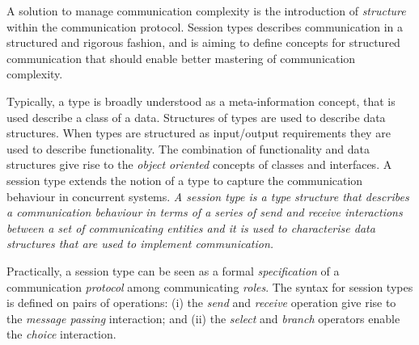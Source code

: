 A solution to manage communication complexity
is the introduction of \emph{structure} within the communication protocol.
Session types describes communication in a structured and rigorous fashion,
and is aiming to define concepts for structured communication
that should enable better mastering of communication complexity.


Typically, a type is broadly understood
as a meta-information concept, that is used describe a class of a data.
Structures of types are used to describe data structures.
When types are structured as input/output requirements they
are used to describe functionality.
The combination of functionality and data structures give rise
to the \emph{object oriented} concepts of classes and interfaces.%
%
A session type extends %
the notion of a type to capture the communication behaviour in concurrent systems.
{\em A session type is a type structure that describes a communication
	behaviour in terms of a series of send and receive %
	interactions between a set of communicating entities and it is used
	to characterise data structures that are used to implement communication.}

Practically, a session type can be seen as a formal
{\em specification} of a communication {\em protocol} among communicating {\em roles}.
The syntax for session types is defined on pairs of operations:
(i) the {\em send} and {\em receive} operation give rise to
the {\em message passing} interaction; and
(ii) the {\em select} and {\em branch} operators enable the
{\em choice} interaction.


